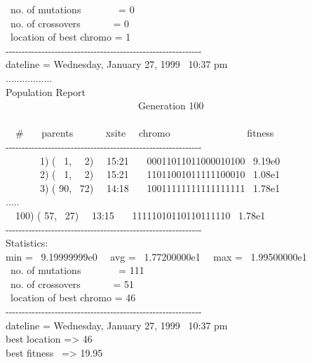 {\ no. of mutations \ \ \ \ \ \ \ = 0 \\
\ no. of crossovers \ \ \ \ \ \ = 0 \\
\ location of best chromo = 1 \\
{}-{}-{}-{}-{}-{}-{}-{}-{}-{}-{}-{}-{}-{}-{}-{}-{}-{}-{}-{}-{}-{}-{}-{}-{}-{}-{}-{}-{}-{}-{}-{}-{}-{}-{}-{}-{}-{}-{}-{}-{}-{}-{}-{}-{}-{}-{}-{}-{}-{}-{}-{}-{}-{}-{}-{}-{}-{}-{}-{}- \\
dateline = Wednesday, January 27, 1999 \ 10:37 pm \\
................. \\
Population Report \\
\>   \ \ \ \ \ \ \ \ \ \ \ \ \ \ \ \ \ \ \ \ \ \ \ \ \ \ \ Generation
100 \\
\ \\
\>   \ \ \# \ \ \ parents \ \ \ \ \ \ xsite \ \ chromo
\ \ \ \ \ \ \ \ \ \ \ \ \ \ \ fitness  \\
{}-{}-{}-{}-{}-{}-{}-{}-{}-{}-{}-{}-{}-{}-{}-{}-{}-{}-{}-{}-{}-{}-{}-{}-{}-{}-{}-{}-{}-{}-{}-{}-{}-{}-{}-{}-{}-{}-{}-{}-{}-{}-{}-{}-{}-{}-{}-{}-{}-{}-{}-{}-{}-{}-{}-{}-{}-{}-{}-{}- \\
\ \ \ \ \ \ \ 1) ( \ 1, \ \ 2) \ \ 15:21 \ \ \ 00011011011000010100
\ 9.19e0 \  \\
\ \ \ \ \ \ \ 2) ( \ 1, \ \ 2) \ \ 15:21 \ \ \ 11011001011111100010
\ 1.08e1 \  \\
\ \ \ \ \ \ \ 3) ( 90, \ 72) \ \ 14:18 \ \ \ 10011111111111111111
\ 1.78e1 \ \  \\
..... \\
\>   \ \ 100) ( 57, \ 27) \ \ 13:15 \ \ \ 11111010110110111110 \ 1.78e1
\  \\
{}-{}-{}-{}-{}-{}-{}-{}-{}-{}-{}-{}-{}-{}-{}-{}-{}-{}-{}-{}-{}-{}-{}-{}-{}-{}-{}-{}-{}-{}-{}-{}-{}-{}-{}-{}-{}-{}-{}-{}-{}-{}-{}-{}-{}-{}-{}-{}-{}-{}-{}-{}-{}-{}-{}-{}-{}-{}-{}-{}- \\
Statistics:  \\
min = \ 9.19999999e0 \ \ avg = \ 1.77200000e1 \ \ max = \ 1.99500000e1 \\
\ no. of mutations \ \ \ \ \ \ \ = 111 \\
\ no. of crossovers \ \ \ \ \ \ = 51 \\
\ location of best chromo = 46 \\
{}-{}-{}-{}-{}-{}-{}-{}-{}-{}-{}-{}-{}-{}-{}-{}-{}-{}-{}-{}-{}-{}-{}-{}-{}-{}-{}-{}-{}-{}-{}-{}-{}-{}-{}-{}-{}-{}-{}-{}-{}-{}-{}-{}-{}-{}-{}-{}-{}-{}-{}-{}-{}-{}-{}-{}-{}-{}-{}-{}- \\
dateline = Wednesday, January 27, 1999 \ 10:37 pm \\
best location ={\textgreater} 46 \\
best fitness \ ={\textgreater} 19.95
}

